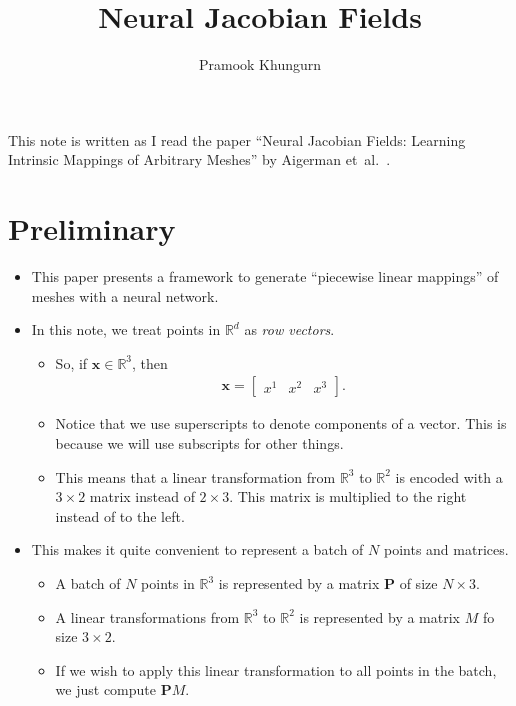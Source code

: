 \documentclass[10pt]{article}
\title{Neural Jacobian Fields}
\author{Pramook Khungurn}
\newcommand{\ve}[1]{\mathbf{#1}}
\newcommand{\etal}{{et~al.}}
\newcommand{\Real}{\mathbb{R}}
\begin{document}
\maketitle


This note is written as I read the paper ``Neural Jacobian Fields: Learning Intrinsic Mappings of Arbitrary Meshes'' by Aigerman \etal~\cite{Aigerman:2022}.

\section{Preliminary}

\begin{itemize}
    \item This paper presents a framework to generate ``piecewise linear mappings'' of meshes with a neural network.
    
    \item In this note, we treat points in $\Real^d$ as \emph{row vectors}.
    \begin{itemize}
        \item So, if $\ve{x} \in \Real^3$, then
        \begin{align*}
            \ve{x} = \begin{bmatrix}
                x^1 & x^2 & x^3
            \end{bmatrix}.
        \end{align*}

        \item Notice that we use superscripts to denote components of a vector. This is because we will use subscripts for other things.

        \item This means that a linear transformation from $\Real^3$ to $\Real^2$ is encoded with a $3 \times 2$ matrix instead of $2 \times 3$. This matrix is multiplied to the right instead of to the left.
    \end{itemize}

    \item This makes it quite convenient to represent a batch of $N$ points and matrices.
    \begin{itemize}
        \item A batch of $N$ points in $\Real^3$ is represented by a matrix $\ve{P}$ of size $N \times 3$.
        \item A linear transformations from $\Real^3$ to $\Real^2$ is represented by a matrix $M$ fo size $3 \times 2$.
        \item If we wish to apply this linear transformation to all points in the batch, we just compute $\ve{P} M$.
    \end{itemize}    
\end{itemize}
\end{document}

